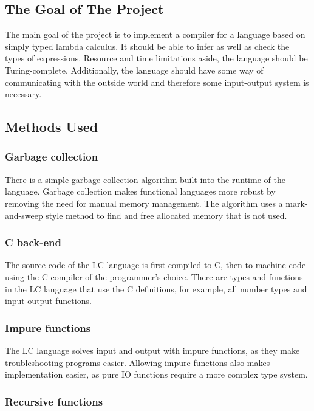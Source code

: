 \documentclass[12pt]{article}
\begin{document}
\subsection{The Goal of The Project}

The main goal of the project is to implement a compiler for a language based on
simply typed lambda calculus. It should be able to infer as well as check the
types of expressions. Resource and time limitations aside, the language should
be Turing-complete. Additionally, the language should have some way of
communicating with the outside world and therefore some input-output system is
necessary.

\subsection{Methods Used}

\subsubsection{Garbage collection}

There is a simple garbage collection algorithm built into the runtime of the
language. Garbage collection makes functional languages more robust by removing
the need for manual memory management. The algorithm uses a mark-and-sweep style
method to find and free allocated memory that is not used.

\subsubsection{C back-end}

The source code of the LC language is first compiled to C, then to machine code
using the C compiler of the programmer's choice. There are types and functions
in the LC language that use the C definitions, for example, all number types and
input-output functions.

\subsubsection{Impure functions}

The LC language solves input and output with impure functions, as they make
troubleshooting programs easier. Allowing impure functions also makes
implementation easier, as pure IO functions require a more complex type system.

\subsubsection{Recursive functions}
\end{document}
